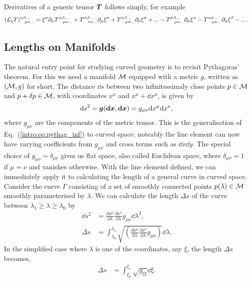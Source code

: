 Derivatives of a generic tensor $\boldsymbol{T}$ follows simply, for example
\begin{equation}(\mathcal{L}_\xi T )^{\alpha\beta ...}_{\,\,\,\,\,\,\mu\nu...} = \xi^\sigma \partial_\sigma T^{\alpha\beta ...}_{\,\,\,\,\,\,\mu\nu...} + T^{\alpha\beta ...}_{\,\,\,\,\,\,\sigma\nu...} \partial_\mu \xi^\sigma + T^{\alpha\beta ...}_{\,\,\,\,\,\,\mu\sigma...} \partial_\nu \xi^\sigma + ... - T^{\sigma\beta ...}_{\,\,\,\,\,\,\mu\nu...}\partial_\sigma \xi^\alpha - T^{\alpha\sigma ...}_{\,\,\,\,\,\,\mu\nu...}\partial_\sigma \xi^\beta - ...\,.
\end{equation} 





\subsection{Lengths on Manifolds}\label{intro:sect:lgm}
The natural entry point for studying curved geometry is to revisit Pythagoras' theorem. For this we need a manifold $\mathcal{M}$ equipped with a metric $g$, written as $(\mathcal{M},g)$ for short. The distance $\dd s$ between two infinitessimaly close points $p\in\mathcal{M}$ and $p+\delta p \in \mathcal{M}$, with coordinates $x^\mu$ and $x^\mu + \dd x^\mu$, is given by
\begin{equation}
\dd s^2 = \boldsymbol{g}(\boldsymbol{\mathrm{d}}\boldsymbol{x},\boldsymbol{\mathrm{d}}\boldsymbol{x}) =  g_{\mu\nu}\dd x^\mu \dd x^\nu,
\end{equation}
where $g_{\mu\nu}$ are the components of the metric tensor. This is the generalisation of Eq.~(\ref{intro:eq:pythag_inf}) to curved space; noteably the line element can now have varying coefficients from $g_{\mu\nu}$ and cross terms such as $\dd x \dd y$. The special choice of $g_{\mu\nu} = \delta_{\mu\nu}$ gives us flat space, also called Euclidean space, where $\delta_{\mu\nu}=1$ if $\mu=\nu$ and vanishes otherwise. With the line elemend defined, we can immediately apply it to calculating the length of a general curve in curved space. Consider the curve $\Gamma$ consisting of a set of smoothly connected points $p(\lambda)\in\mathcal{M}$ smoothly parameterised by $\lambda$. We can calculate the length $\Delta s$ of the curve between $\lambda_1 \geq\lambda\geq\lambda_0$ by
\begin{align}
\dd s ^2 &= \frac{\partial x^\mu}{\partial \lambda}\frac{\partial x^\nu}{\partial \lambda}g_{\mu\nu}\dd \lambda^2,\\
\label{intro:eq:Delta_s}\Delta s &= \int_{\lambda_0}^{\lambda_1}\sqrt{\left(\frac{\partial x^\mu}{\partial \lambda}\frac{\partial x^\nu}{\partial \lambda}g_{\mu\nu}\right)}\dd \lambda.
\end{align}
In the simplified case where $\lambda$ is one of the coordinates, say $\xi$, the length $\Delta s$ becomes,
\begin{align} \label{intro:eq:coord_interval_length}
\Delta s &= \int_{\xi_0}^{\xi_1}\sqrt{g_{\xi\xi}}\dd \xi.
\end{align}




